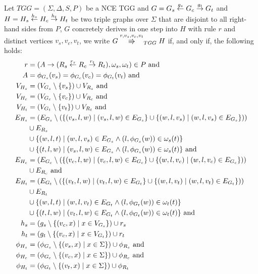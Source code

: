 \documentclass[runningheads]{llncs}
\begin{document}
\begin{definition}
	\label{def:tgg_dstep}
	Let $TGG = (\Sigma, \Delta, S, P)$ be a NCE TGG and $G = G_s \overset{g_s}{\leftarrow} G_c \overset{g_t}{\rightarrow} G_t$ and $H = H_s \overset{h_s}{\leftarrow} H_c \overset{h_t}{\rightarrow} H_t$ be two triple graphs over $\Sigma$ that are disjoint to all right-hand sides from $P$, $G$ concretely derives in one step into $H$ with rule $r$ and distinct vertices $v_s, v_c, v_t$, we write $G \tcderiv{r}{v_s,v_c,v_t}{TGG} H$ if, and only if, the following holds:
	\begin{align*}
		r & = (A \to (R_s \overset{r_s}{\leftarrow} R_c \overset{r_t}{\rightarrow} R_t), \omega_s, \omega_t) \in P \text{ and } \\
		A & = \phi_{G_s}(v_s) = \phi_{G_c}(v_c) = \phi_{G_t}(v_t) \text{ and}\\
		V_{H_s}  & = (V_{G_s} \setminus \{v_s\}) \cup V_{R_s} \text{ and}\\
		V_{H_c}  & = (V_{G_c} \setminus \{v_c\}) \cup V_{R_c} \text{ and}\\
		V_{H_t}  & = (V_{G_t} \setminus \{v_t\}) \cup V_{R_t} \text{ and}\\
		E_{H_s} & = (E_{G_s} \setminus (\{(v_s,l,w) \; | \; (v_s,l,w) \in E_{G_s}\} \cup \{(w,l,v_s) \; | \; (w,l,v_s) \in E_{G_s}\})) \\
		& \cup E_{R_s} \\
		& \cup \{(w,l,t) \; | \; (w,l,v_s) \in E_{G_s} \land (l,\phi_{G_s}(w)) \in \omega_{s}(t)\} \\
		& \cup \{(t,l,w) \; | \; (v_s,l,w) \in E_{G_s} \land (l,\phi_{G_s}(w)) \in \omega_{s}(t)\} \text{ and} \\
		E_{H_c} & = (E_{G_c} \setminus (\{(v_c,l,w) \; | \; (v_c,l,w) \in E_{G_c}\} \cup \{(w,l,v_c) \; | \; (w,l,v_c) \in E_{G_c}\})) \\
		& \cup E_{R_c} \text{ and} \\
		E_{H_t} & = (E_{G_t} \setminus (\{(v_t,l,w) \; | \; (v_t,l,w) \in E_{G_t}\} \cup \{(w,l,v_t) \; | \; (w,l,v_t) \in E_{G_t}\})) \\
		& \cup E_{R_t} \\
		& \cup \{(w,l,t) \; | \; (w,l,v_t) \in E_{G_t} \land (l,\phi_{G_t}(w)) \in \omega_{t}(t)\} \\
		& \cup \{(t,l,w) \; | \; (v_t,l,w) \in E_{G_t} \land (l,\phi_{G_t}(w)) \in \omega_{t}(t)\} \text{ and} \\
		h_s		& = (g_s \setminus \{(v_c,x) \; | \; x \in V_{G_s}\}) \cup r_s  \\
		h_t		& = (g_t \setminus \{(v_c,x) \; | \; x \in V_{G_t}\}) \cup r_t  \\
		\phi_{H_s} & = (\phi_{G_s} \setminus \{(v_s,x) \; | \; x \in \Sigma\}) \cup \phi_{R_s} \text{ and}\\
		\phi_{H_c} & = (\phi_{G_c} \setminus \{(v_c,x) \; | \; x \in \Sigma\}) \cup \phi_{R_c} \text{ and}\\
		\phi_{H_t} & = (\phi_{G_t} \setminus \{(v_t,x) \; | \; x \in \Sigma\}) \cup \phi_{R_t}\\
	\end{align*}
\end{definition}
\end{document}
